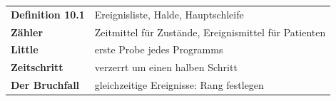 \begin{merksatz}
\begin{center}
\renewcommand{\arraystretch}{1.5}
\begin{tabular}{@{}P{3.0cm}P{5.6cm}@{}}
\toprule
\textbf{Definition 10.1} & Ereignisliste, Halde, Hauptschleife\\
\textbf{Zähler} & Zeitmittel für Zustände, Ereignismittel für Patienten\\
\textbf{Little} & erste Probe jedes Programms\\
\textbf{Zeitschritt} & verzerrt um einen halben Schritt\\
\textbf{Der Bruchfall} & gleichzeitige Ereignisse: Rang festlegen\\
\bottomrule
\end{tabular}
\end{center}

\begin{center}
\begin{minipage}{0.88\textwidth}
\end{minipage}
\end{center}
\end{merksatz}
